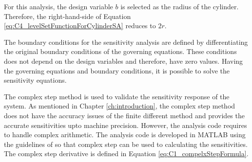 For this analysis, the design variable $b$ is selected as the radius of the cylinder. Therefore, the right-hand-side of Equation \eqref{eq:C4_levelSetFunctionForCylinderSA} reduces to $2r$.

The boundary conditions for the sensitivity analysis are defined by differentiating the original boundary conditions of the governing equations. These conditions does not depend on the design variables and therefore, have zero values. Having the governing equations and boundary conditions, it is possible to solve the sensitivity equations.

The complex step method is used to validate the sensitivity response of the system. As mentioned in Chapter \ref{ch:introduction}, the complex step method does not have the accuracy issues of the finite different method and provides the accurate sensitivities upto machine precision. However, the analysis code requires to handle complex arithmetic. The analysis code is developed in MATLAB using the guidelines of \cite{martins2003complex} so that complex step can be used to calculating the sensitivities. The complex step derivative is defined in Equation \eqref{eq:C1_compelxStepFormula}.